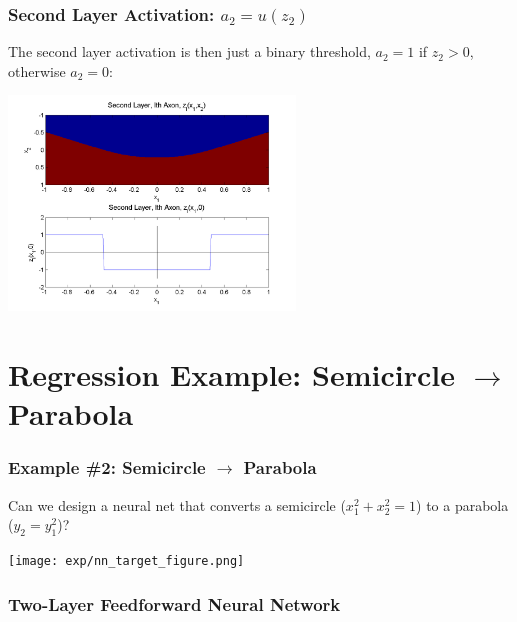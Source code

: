 \documentclass{beamer}
\begin{document}
\begin{frame}
  \frametitle{Second Layer Activation: $a_2=u(z_2)$}

  The second layer activation is then just a binary threshold, $a_2=1$
  if $z_2>0$, otherwise $a_2=0$:
  
  \centerline{\includegraphics[width=3in]{figs/nn_axon2.png}}
\end{frame}


\section[Regression]{Regression Example: Semicircle $\rightarrow$ Parabola}
\setcounter{subsection}{1}

\begin{frame}
  \frametitle{Example \#2: Semicircle $\rightarrow$ Parabola}

  Can we design a neural net that converts a semicircle
  ($x_1^2+x_2^2=1$) to a parabola ($y_2=y_1^2$)?
  \centerline{\texttt{[image: exp/nn\_target\_figure.png]}}
\end{frame}

\begin{frame}
  \frametitle{Two-Layer Feedforward Neural Network}
  \begin{small}\end{small}
\end{frame}
\end{document}
